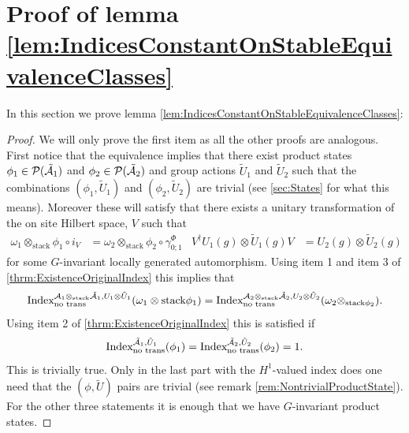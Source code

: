 \documentclass[12pt,a4paper,twoside]{article}
\numberwithin{equation}{section}
\begin{document}
\section{Proof of lemma \ref{lem:IndicesConstantOnStableEquivalenceClasses}}\label{sec:ProofOf:lem:IndicesConstantOnStableEquivalenceClasses}
In this section we prove lemma \ref{lem:IndicesConstantOnStableEquivalenceClasses}:
\begin{proof}
	We will only prove the first item as all the other proofs are analogous. First notice that the equivalence implies that there exist product states $\phi_1\in\PP(\tilde\AA_1)$ and $\phi_2\in\PP(\tilde\AA_2)$ and group actions $\tilde U_1$ and $\tilde U_2$ such that the combinations $(\phi_1,\tilde U_1)$ and $(\phi_2,\tilde U_2)$ are trivial (see \ref{sec:States} for what this means). Moreover these will satisfy that there exists a unitary transformation of the on site Hilbert space, $V$ such that
	\begin{align}
		\omega_1\otimes_{\text{stack}}\phi_1\circ i_V&=\omega_2\otimes_{\text{stack}}\phi_2\circ\gamma^\Phi_{0;1}&V^\dagger U_{1}(g)\otimes \tilde{U}_{1}(g)V&=U_{2}(g)\otimes \tilde{U}_{2}(g)
	\end{align}
	for some $G$-invariant locally generated automorphism. Using item 1 and item 3 of \ref{thrm:ExistenceOriginalIndex} this implies that
	\begin{equation}
		\textrm{Index}^{\AA_1\otimes_{\text{stack}}\tilde \AA_1,U_1\otimes \tilde U_1}_{\text{no trans}}(\omega_1\otimes\text{stack}\phi_1) =\textrm{Index}^{\AA_2\otimes_{\text{stack}}\tilde \AA_2,U_2\otimes\tilde U_2}_{\text{no trans}}(\omega_2\otimes_{\text{stack}\phi_2}).
	\end{equation}
	Using item 2 of \ref{thrm:ExistenceOriginalIndex} this is satisfied if
	\begin{equation}
		\textrm{Index}^{\tilde \AA_1,\tilde U_1}_{\text{no trans}}(\phi_1)=\textrm{Index}^{\tilde \AA_2,\tilde U_2}_{\text{no trans}}(\phi_2)=1.
	\end{equation}
	This is trivially true. Only in the last part with the $H^1$-valued index does one need that the $(\phi,\tilde U)$ pairs are trivial (see remark \ref{rem:NontrivialProductState}). For the other three statements it is enough that we have $G$-invariant product states.
\end{proof}
\end{document}
